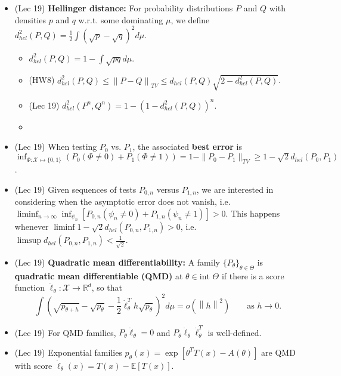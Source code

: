 \documentclass[twoside]{article}
\newcommand{\dis}{\displaystyle}
\newcommand{\norm}[1]{\left\|{#1}\right\|} %
\newcommand\bbE{\mathbb{E}}
\newcommand\bbR{\mathbb{R}}
\def\t{\theta}
\newcommand\T{\Theta}
\newcommand\goesto{\rightarrow}
\begin{document}
\begin{itemize}
\item (Lec 19) \textbf{Hellinger distance:} For probability distributions $P$ and $Q$ with densities $p$ and $q$ w.r.t. some dominating $\mu$, we define $d_{hel}^2 (P, Q) = \dis\frac{1}{2}\int(\sqrt{p}-\sqrt{q})^2 d\mu$.
\begin{itemize}
\item $d_{hel}^2 (P, Q) = 1 - \dis\int \sqrt{pq} d\mu$.

\item (HW8) $d_{hel}^2 (P, Q) \leq \norm{P-Q}_{TV} \leq d_{hel} (P, Q) \sqrt{2 - d_{hel}^2 (P, Q)}$.

\item (Lec 19) $d_{hel}^2 (P^n, Q^n) = 1 - \left( 1 - d_{hel}^2(P,Q)\right)^n$.

\item 
\end{itemize}

\item (Lec 19) When testing $P_0$ vs. $P_1$, the associated \textbf{best error} is $\dis\inf_{\Phi:\mathcal{X} \mapsto \{0,1\}} \left(P_0(\Phi \neq 0) + P_1(\Phi \neq 1)\right) = 1 - \| P_0 - P_1 \|_{TV} \geq 1 - \sqrt{2}d_{hel}(P_0, P_1)$.

\item (Lec 19) Given sequences of tests $P_{0,n}$ versus $P_{1,n}$, we are interested in
considering when the asymptotic error does not vanish, i.e. $\dis\liminf_{n \to \infty} \inf_{\psi_n} [P_{0,n}(\psi_n \not= 0) + P_{1,n}(\psi_n \not= 1)] > 0$. This happens whenever $\liminf 1 - \sqrt{2}d_{hel}(P_{0,n}, P_{1,n}) > 0$, i.e. $\limsup d_{hel}(P_{0,n}, P_{1,n}) < \dis\frac{1}{\sqrt{2}}$.

\item (Lec 19) \textbf{Quadratic mean differentiability:} A family $\{ P_\t\}_{\t \in \T}$ is \textbf{quadratic mean differentiable (QMD)} at $\t \in \text{int } \T$ if there is a score function $\dot\ell_\theta : \mathcal{X} \to \bbR^d$, so that
\[ \int \left( \sqrt{p_{\t + h}} - \sqrt{p_{\t}} - \frac{1}{2} \dot\ell_\t^T h \sqrt{p_\t} \right)^2 d\mu = o\left(\norm{h}^2\right) \qquad \text{as } h \goesto 0. \]

\item (Lec 19) For QMD families, $P_\t \dot\ell_\t = 0$ and $P_\t \dot\ell_\t \dot\ell_\t^T$ is well-defined.

\item (Lec 19) Exponential families $p_\t(x) = \exp \left[ \t^T T(x) - A(\t) \right]$ are QMD with score $\dot\ell_{\t}(x) = T(x) - \bbE [T(x)]$.


\end{itemize}
\end{document}
